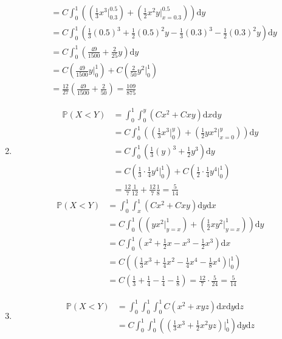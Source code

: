\begin{enumerate}[label=\alph*.]
\begin{align*}
&= C \int_0^1 \left(\left(\frac{1}{3}x^3 \Big|_{0.3}^{0.5} \right) + \left( \frac{1}{2}x^2 y \Big|_{x=0.3}^{0.5} \right) \right) \mathrm d y \\
&= C \int_0^1 \left(\frac{1}{3}(0.5)^3 + \frac{1}{2}(0.5)^2 y - \frac{1}{3}(0.3)^3 - \frac{1}{2}(0.3)^2 y \right) \mathrm d y \\
&= C \int_0^1 \left(\frac{49}{1500} + \frac{2}{25} y \right) \mathrm d y \\
&= C \left( \frac{49}{1500}y \Big|_0^1 \right) + C \left( \frac{2}{50} y^2 \Big|_0^1 \right) \\
&= \frac{12}{27}\left(\frac{49}{1500} + \frac{2}{50} \right) = \frac{109}{875}
\end{align*}
\item
\begin{align*}
\mathbb{P}(X < Y) &= \int_0^1 \int_0^y (Cx^2 + Cxy) \mathrm d x \mathrm d y \\
&= C \int_0^1 \left( \left( \frac{1}{3}x^3 \Big|_0^y \right) + \left( \frac{1}{2} y x^2 \Big|_{x=0}^y \right) \right) \mathrm d y \\
&= C \int_0^1 \left( \frac{1}{3} (y)^3 + \frac{1}{2} y^3 \right) \mathrm d y \\
&= C \left(\frac{1}{3}\cdot\frac{1}{4} y^4 \Big|_0^1 \right) + C \left(\frac{1}{2}\cdot\frac{1}{4} y^4 \Big|_0^1 \right) \\
&= \frac{12}{7} \frac{1}{12} + \frac{12}{7} \frac{1}{8} = \frac{5}{14}
\end{align*}
\begin{align*}
\mathbb{P}(X < Y) &= \int_0^1 \int_x^1 \left( C x^2 + C xy \right) \mathrm dy \mathrm dx \\
&= C \int_0^1 \left( \left( yx^2 \Big|_{y=x}^1 \right) + \left(\frac{1}{2} xy^2 \Big|_{y=x}^1 \right) \right) \mathrm d y \\
&= C \int_0^1 \left( x^2 + \frac{1}{2} x - x^3 - \frac{1}{2} x^3 \right) \mathrm d x \\
&= C \left( ( \frac{1}{3}x^3 + \frac{1}{4}x^2 - \frac{1}{4}x^4 - \frac{1}{8}x^4) \Big|_0^1 \right) \\
&= C \left( \frac{1}{3} + \frac{1}{4} - \frac{1}{4} - \frac{1}{8} \right) = \frac{12}{7} \cdot \frac{5}{24} = \frac{5}{14} 
\end{align*}
\item
\begin{align*}
\mathbb{P}(X < Y) &= \int_0^1 \int_0^1 \int_0^1 C \left(x^2 + xyz \right) \mathrm d x \mathrm d y \mathrm d z \\
&= C \int_0^1 \int_0^1 \left( (\frac{1}{3}x^3 + \frac{1}{2}x^2 yz) \Big|_0^1 \right) \mathrm d y \mathrm d z 

\end{align*}
\end{enumerate}
